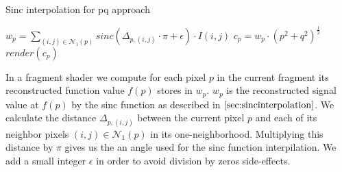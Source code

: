 \begin{algorithm}[H]
  \caption{Sinc interpolation for pq approach}
  \begin{algorithmic}
      \State $w_p = \sum_{(i,j) \in \mathcal{N}_{1}(p)} sinc(\Delta_{p,(i,j)} \cdot \pi + \epsilon) \cdot I(i,j)$
      \State $c_p = w_p \cdot (p^2 + q^2)^{\frac{1}{2}}$
      \State $render(c_p)$
    \EndFor
  \end{algorithmic}
  \label{alg:sincinterpolation}
\end{algorithm}

In a fragment shader we compute for each pixel $p$ in the current fragment its reconstructed function value $f(p)$ stores in $w_p$. $w_p$ is the reconstructed signal value at $f(p)$ by the sinc function as described in $\ref{sec:sincinterpolation}$.
We calculate the distance $\Delta_{p,(i,j)}$ between the current pixel $p$ and each of its neighbor pixels $(i,j) \in \mathcal{N}_{1}(p)$ in its one-neighborhood. Multiplying this distance by $\pi$ gives us the an angle used for the sinc function interpilation. We add a small integer $\epsilon$ in order to avoid division by zeros side-effects.

